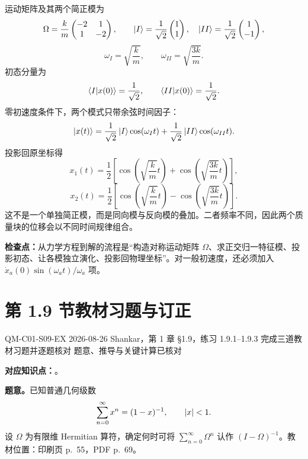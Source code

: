 \begin{checkedsolution}
运动矩阵及其两个简正模为
\[
  \Omega=\frac{k}{m}\begin{pmatrix}-2&1\\1&-2\end{pmatrix},
  \qquad
  \left|I\right\rangle=\frac1{\sqrt2}\begin{pmatrix}1\\1\end{pmatrix},
  \quad
  \left|II\right\rangle=\frac1{\sqrt2}\begin{pmatrix}1\\-1\end{pmatrix},
\]
\[
  \omega_I=\sqrt{\frac{k}{m}},
  \qquad
  \omega_{II}=\sqrt{\frac{3k}{m}}.
\]
初态分量为
\[
  \left\langle I \middle| x(0) \right\rangle=\frac1{\sqrt2},
  \qquad
  \left\langle II \middle| x(0) \right\rangle=\frac1{\sqrt2}.
\]
零初速度条件下，两个模式只带余弦时间因子：
\[
  \left|x(t)\right\rangle
  =\frac1{\sqrt2}\left|I\right\rangle\cos(\omega_It)
  +\frac1{\sqrt2}\left|II\right\rangle\cos(\omega_{II}t).
\]
投影回原坐标得
\[
  x_1(t)=\frac12\left[
    \cos\left(\sqrt{\frac{k}{m}}t\right)
    +\cos\left(\sqrt{\frac{3k}{m}}t\right)
  \right],
\]
\[
  x_2(t)=\frac12\left[
    \cos\left(\sqrt{\frac{k}{m}}t\right)
    -\cos\left(\sqrt{\frac{3k}{m}}t\right)
  \right].
\]
这不是一个单独简正模，而是同向模与反向模的叠加。二者频率不同，因此两个质量块的位移会以不同时间规律组合。
\end{checkedsolution}

\textbf{检查点：}从力学方程到解的流程是“构造对称运动矩阵 $\Omega$、求正交归一特征模、投影初态、让各模独立演化、投影回物理坐标”。对一般初速度，还必须加入 $\dot x_a(0)\sin(\omega_at)/\omega_a$ 项。

\section{第 1.9 节教材习题与订正}
\label{exercise-set:QM-C01-S09}

\exercisemeta
  {QM-C01-S09-EX}
  {2026-08-26}
  {Shankar，第 1 章 \S 1.9，练习 1.9.1--1.9.3}
  {完成三道教材习题并逐题核对}
  {题意、推导与关键计算已核对}


\textbf{对应知识点：}。

\textbf{题意。}已知普通几何级数
\[
  \sum_{n=0}^{\infty}x^n=(1-x)^{-1},
  \qquad \left|x\right|<1.
\]
设 $\Omega$ 为有限维 Hermitian 算符，确定何时可将 $\sum_{n=0}^{\infty}\Omega^n$ 认作 $(I-\Omega)^{-1}$。教材位置：印刷页 p.~55，PDF p.~69。

